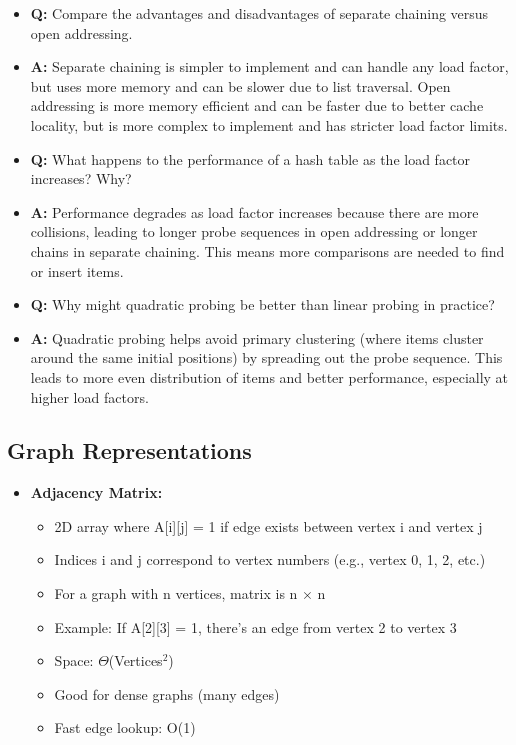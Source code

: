 \documentclass[11pt,a4paper]{article}
\begin{document}
\begin{multicols}{2}
\begin{itemize}
    \item \textbf{Q:} Compare the advantages and disadvantages of separate chaining versus open addressing.
    \item \textbf{A:} Separate chaining is simpler to implement and can handle any load factor, but uses more memory and can be slower due to list traversal. Open addressing is more memory efficient and can be faster due to better cache locality, but is more complex to implement and has stricter load factor limits.

    \item \textbf{Q:} What happens to the performance of a hash table as the load factor increases? Why?
    \item \textbf{A:} Performance degrades as load factor increases because there are more collisions, leading to longer probe sequences in open addressing or longer chains in separate chaining. This means more comparisons are needed to find or insert items.

    \item \textbf{Q:} Why might quadratic probing be better than linear probing in practice?
    \item \textbf{A:} Quadratic probing helps avoid primary clustering (where items cluster around the same initial positions) by spreading out the probe sequence. This leads to more even distribution of items and better performance, especially at higher load factors.
\end{itemize}

\subsection{Graph Representations}
\begin{itemize}
    \item \textbf{Adjacency Matrix:}
    \begin{itemize}
        \item 2D array where A[i][j] = 1 if edge exists between vertex i and vertex j
        \item Indices i and j correspond to vertex numbers (e.g., vertex 0, 1, 2, etc.)
        \item For a graph with n vertices, matrix is n $\times$ n
        \item Example: If A[2][3] = 1, there's an edge from vertex 2 to vertex 3
        \item Space: $\Theta$(Vertices$^2$)
        \item Good for dense graphs (many edges)
        \item Fast edge lookup: O(1)
    \end{itemize}


\end{itemize}
\end{multicols}
\end{document}
